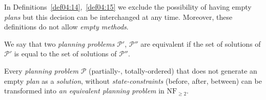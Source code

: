 \medskip\noindent
In Definitions~\ref{def04:14},~\ref{def04:15} we exclude the possibility of having empty \emph{plans} but this decision can be interchanged at any time. Moreover, these definitions do not allow \emph{empty methods}.

\begin{defn}\label{def04:16}
    We say that two \emph{planning problems} $\mathcal{P'}$, $\mathcal{P''}$ are equivalent if the set of solutions of $\mathcal{P'}$ is equal to the set of solutions of $\mathcal{P''}$.
\end{defn}

\begin{thm}\label{thm04:5}
    Every \emph{planning problem} $\mathcal{P}$ (partially-, totally-ordered) that does not generate an empty \emph{plan} as a \emph{solution}, without \emph{state-constraints} (before, after, between) can be transformed into \emph{an equivalent planning problem} in $\text{NF}_{\geq 2}$.
\end{thm}
